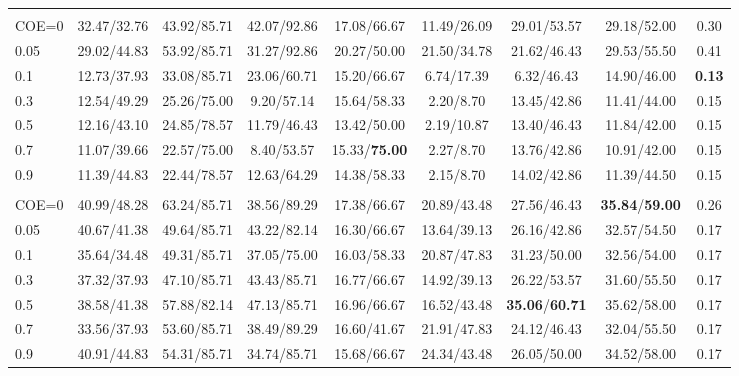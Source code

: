 \begin{table}[t]
\begin{tabular}{@{}lcccccccc@{}}
\rowcolor{gray!15}
\multicolumn{9}{@{}l@{}}{\textbf{\textbf{BudgetMem-\textsc{Imp}} (COE)}} \\
COE=0   & 32.47/32.76 & 43.92/85.71 & 42.07/92.86 & 17.08/66.67 & 11.49/26.09 & 29.01/53.57 & 29.18/52.00 & 0.30 \\
0.05    & 29.02/44.83 & 53.92/85.71 & 31.27/92.86 & 20.27/50.00 & 21.50/34.78 & 21.62/46.43 & 29.53/55.50 & 0.41 \\
0.1     & 12.73/37.93 & 33.08/85.71 & 23.06/60.71 & 15.20/66.67 & 6.74/17.39  & 6.32/46.43  & 14.90/46.00 & \textbf{0.13} \\
0.3     & 12.54/49.29 & 25.26/75.00 & 9.20/57.14  & 15.64/58.33 & 2.20/8.70   & 13.45/42.86 & 11.41/44.00 & 0.15 \\
0.5     & 12.16/43.10 & 24.85/78.57 & 11.79/46.43 & 13.42/50.00 & 2.19/10.87  & 13.40/46.43 & 11.84/42.00 & 0.15 \\
0.7     & 11.07/39.66 & 22.57/75.00 & 8.40/53.57  & 15.33/\textbf{75.00} & 2.27/8.70   & 13.76/42.86 & 10.91/42.00 & 0.15 \\
0.9     & 11.39/44.83 & 22.44/78.57 & 12.63/64.29 & 14.38/58.33 & 2.15/8.70   & 14.02/42.86 & 11.39/44.50 & 0.15 \\
\midrule

\rowcolor{gray!15}
\multicolumn{9}{@{}l@{}}{\textbf{\textbf{BudgetMem-\textsc{Rea}} (COE)}} \\
COE=0   & 40.99/48.28 & 63.24/85.71 & 38.56/89.29 & 17.38/66.67 & 20.89/43.48 & 27.56/46.43 & \textbf{35.84}/\textbf{59.00} & 0.26 \\
0.05    & 40.67/41.38 & 49.64/85.71 & 43.22/82.14 & 16.30/66.67 & 13.64/39.13 & 26.16/42.86 & 32.57/54.50 & 0.17 \\
0.1     & 35.64/34.48 & 49.31/85.71 & 37.05/75.00 & 16.03/58.33 & 20.87/47.83 & 31.23/50.00 & 32.56/54.00 & 0.17 \\
0.3     & 37.32/37.93 & 47.10/85.71 & 43.43/85.71 & 16.77/66.67 & 14.92/39.13 & 26.22/53.57 & 31.60/55.50 & 0.17 \\
0.5     & 38.58/41.38 & 57.88/82.14 & 47.13/85.71 & 16.96/66.67 & 16.52/43.48 & \textbf{35.06}/\textbf{60.71} & 35.62/58.00 & 0.17 \\
0.7     & 33.56/37.93 & 53.60/85.71 & 38.49/89.29 & 16.60/41.67 & 21.91/47.83 & 24.12/46.43 & 32.04/55.50 & 0.17 \\
0.9     & 40.91/44.83 & 54.31/85.71 & 34.74/85.71 & 15.68/66.67 & 24.34/43.48 & 26.05/50.00 & 34.52/58.00 & 0.17 \\
\midrule


\end{tabular}
\end{table}
